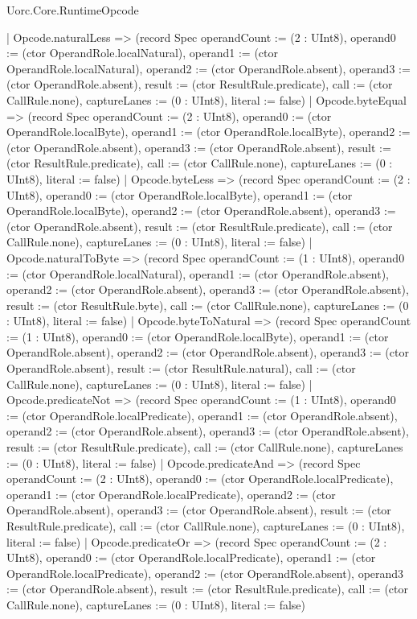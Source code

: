 \begin{lexlean}{Uorc.Core.RuntimeOpcode}
\begin{semanticmodule}
{    | Opcode.naturalLess => (record Spec {operandCount := (2 : UInt8), operand0 := (ctor OperandRole.localNatural), operand1 := (ctor OperandRole.localNatural), operand2 := (ctor OperandRole.absent), operand3 := (ctor OperandRole.absent), result := (ctor ResultRule.predicate), call := (ctor CallRule.none), captureLanes := (0 : UInt8), literal := false})
    | Opcode.byteEqual => (record Spec {operandCount := (2 : UInt8), operand0 := (ctor OperandRole.localByte), operand1 := (ctor OperandRole.localByte), operand2 := (ctor OperandRole.absent), operand3 := (ctor OperandRole.absent), result := (ctor ResultRule.predicate), call := (ctor CallRule.none), captureLanes := (0 : UInt8), literal := false})
    | Opcode.byteLess => (record Spec {operandCount := (2 : UInt8), operand0 := (ctor OperandRole.localByte), operand1 := (ctor OperandRole.localByte), operand2 := (ctor OperandRole.absent), operand3 := (ctor OperandRole.absent), result := (ctor ResultRule.predicate), call := (ctor CallRule.none), captureLanes := (0 : UInt8), literal := false})
    | Opcode.naturalToByte => (record Spec {operandCount := (1 : UInt8), operand0 := (ctor OperandRole.localNatural), operand1 := (ctor OperandRole.absent), operand2 := (ctor OperandRole.absent), operand3 := (ctor OperandRole.absent), result := (ctor ResultRule.byte), call := (ctor CallRule.none), captureLanes := (0 : UInt8), literal := false})
    | Opcode.byteToNatural => (record Spec {operandCount := (1 : UInt8), operand0 := (ctor OperandRole.localByte), operand1 := (ctor OperandRole.absent), operand2 := (ctor OperandRole.absent), operand3 := (ctor OperandRole.absent), result := (ctor ResultRule.natural), call := (ctor CallRule.none), captureLanes := (0 : UInt8), literal := false})
    | Opcode.predicateNot => (record Spec {operandCount := (1 : UInt8), operand0 := (ctor OperandRole.localPredicate), operand1 := (ctor OperandRole.absent), operand2 := (ctor OperandRole.absent), operand3 := (ctor OperandRole.absent), result := (ctor ResultRule.predicate), call := (ctor CallRule.none), captureLanes := (0 : UInt8), literal := false})
    | Opcode.predicateAnd => (record Spec {operandCount := (2 : UInt8), operand0 := (ctor OperandRole.localPredicate), operand1 := (ctor OperandRole.localPredicate), operand2 := (ctor OperandRole.absent), operand3 := (ctor OperandRole.absent), result := (ctor ResultRule.predicate), call := (ctor CallRule.none), captureLanes := (0 : UInt8), literal := false})
    | Opcode.predicateOr => (record Spec {operandCount := (2 : UInt8), operand0 := (ctor OperandRole.localPredicate), operand1 := (ctor OperandRole.localPredicate), operand2 := (ctor OperandRole.absent), operand3 := (ctor OperandRole.absent), result := (ctor ResultRule.predicate), call := (ctor CallRule.none), captureLanes := (0 : UInt8), literal := false})
}
\end{semanticmodule}
\end{lexlean}
